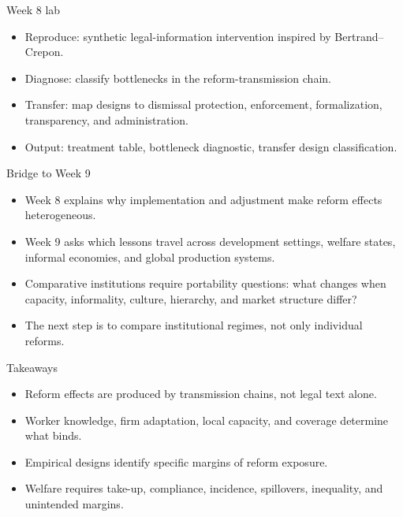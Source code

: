 \documentclass[aspectratio=169,11pt]{beamer}
\begin{document}
\begin{frame}{Week 8 lab}
\begin{itemize}
    \item Reproduce: synthetic legal-information intervention inspired by Bertrand--Crepon.
    \item Diagnose: classify bottlenecks in the reform-transmission chain.
    \item Transfer: map designs to dismissal protection, enforcement, formalization, transparency, and administration.
    \item Output: treatment table, bottleneck diagnostic, transfer design classification.
\end{itemize}
\end{frame}

\begin{frame}{Bridge to Week 9}
\begin{itemize}
    \item Week 8 explains why implementation and adjustment make reform effects heterogeneous.
    \item Week 9 asks which lessons travel across development settings, welfare states, informal economies, and global production systems.
    \item Comparative institutions require portability questions: what changes when capacity, informality, culture, hierarchy, and market structure differ?
    \item The next step is to compare institutional regimes, not only individual reforms.
\end{itemize}
\end{frame}

\begin{frame}{Takeaways}
\begin{itemize}
    \item Reform effects are produced by transmission chains, not legal text alone.
    \item Worker knowledge, firm adaptation, local capacity, and coverage determine what binds.
    \item Empirical designs identify specific margins of reform exposure.
    \item Welfare requires take-up, compliance, incidence, spillovers, inequality, and unintended margins.
\end{itemize}
\end{frame}
\end{document}
